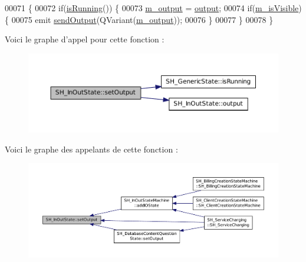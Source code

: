 \begin{DoxyCode}
00071 \{
00072     \textcolor{keywordflow}{if}(\hyperlink{classSH__GenericState_a5f731810dad0cacd28828ccbf1539e4e}{isRunning}()) \{
00073         \hyperlink{classSH__InOutState_ae735e741ce229d2600448d8daa0abc2d}{m\_output} = \hyperlink{classSH__InOutState_a17ed7eaf5e3ed5af80a4f9fe65d5bfd9}{output};
00074         \textcolor{keywordflow}{if}(\hyperlink{classSH__InOutState_a8fd66b185c9a55f0e84daa97e2acf53a}{m\_isVisible}) \{
00075             emit \hyperlink{classSH__InOutState_a77921c5f42059bc97361f4ff7827da12}{sendOutput}(QVariant(\hyperlink{classSH__InOutState_ae735e741ce229d2600448d8daa0abc2d}{m\_output}));
00076         \}
00077     \}
00078 \}
\end{DoxyCode}


Voici le graphe d'appel pour cette fonction \-:\nopagebreak
\begin{figure}[H]
\begin{center}
\leavevmode
\includegraphics[width=350pt]{classSH__InOutState_af611c84134e262739cd834797b315c80_cgraph}
\end{center}
\end{figure}




Voici le graphe des appelants de cette fonction \-:\nopagebreak
\begin{figure}[H]
\begin{center}
\leavevmode
\includegraphics[width=350pt]{classSH__InOutState_af611c84134e262739cd834797b315c80_icgraph}
\end{center}
\end{figure}


